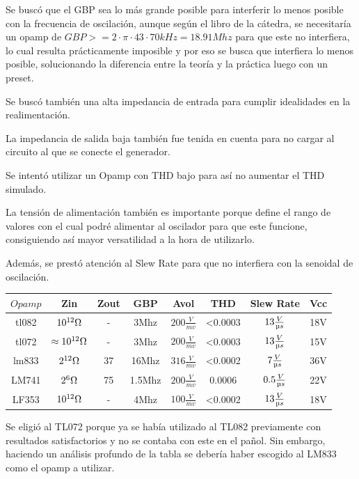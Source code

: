 \documentclass[../../tc_tp6_main.tex]{subfiles}
\begin{document}
Se buscó que el GBP sea lo más grande posible para interferir lo menos posible con la frecuencia de oscilación, aunque según el libro de la cátedra, se necesitaría un opamp de $GBP >= 2\cdot \pi\cdot 43\cdot70kHz = 18.91Mhz$ para que este no interfiera, lo cual resulta prácticamente imposible y por eso se busca que interfiera lo menos posible, solucionando la diferencia entre la teoría y la práctica luego con un preset.\par
Se buscó también una alta impedancia de entrada para cumplir idealidades en la realimentación.\par
La impedancia de salida baja también fue tenida en cuenta para no cargar al circuito al que se conecte el generador.\par
Se intentó utilizar un Opamp con THD bajo para así no aumentar el THD simulado.\par
La tensión de alimentación también es importante porque define el rango de valores con el cual podré alimentar al oscilador para que este funcione, consiguiendo así mayor versatilidad a la hora de utilizarlo.\par
Además, se prestó atención al Slew Rate para que no interfiera con la senoidal de oscilación.\par

 	\begin{table}[H] %
				\centering
 				\begin{tabular}{||c c c c c c c c||} 
 					\hline
					$Opamp$ & Zin & Zout & GBP & Avol & THD & Slew Rate&Vcc\\ [0.5ex] 
 					\hline\hline
					tl082 & $10^{12}\ohm$ & -& 3Mhz& $200\frac{V}{mv}$&<0.0003&$13\frac{V}{\micro s}$&18V\\
					tl072 & $\approx10^{12}\ohm$ & -& 3Mhz& $200\frac{V}{mv}$&<0.0003&$13\frac{V}{\micro s}$&15V\\
 				lm833 & $2^{12}\ohm$ & 37\ohm& 16Mhz& $316\frac{V}{mv}$&<0.0002&$7\frac{V}{\micro s}$&36V\\
					LM741 & $2^6\ohm$ & 75\ohm& 1.5Mhz& $200\frac{V}{mv}$&0.0006&$0.5\frac{V}{\micro s}$&22V\\
					LF353 & $10^{12}\ohm$ &- & 4Mhz& $100\frac{V}{mv}$&<0.0002&$13\frac{V}{\micro s}$&18V\\[1ex] 
					\hline
				\end{tabular}
			\end{table}
			
			Se eligió al TL072 porque ya se había utilizado al TL082 previamente con resultados satisfactorios y no se contaba con este en el pañol. Sin embargo, haciendo un análisis profundo de la tabla se debería haber escogido al LM833 como el opamp a utilizar.
\end{document}
